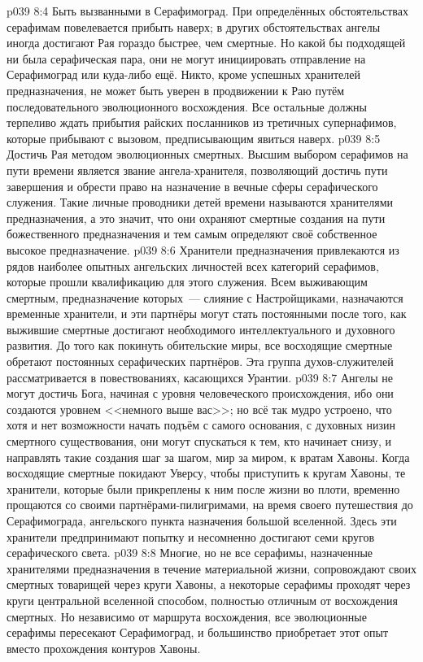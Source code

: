 \vs p039 8:4 Быть вызванными в Серафимоград. При определённых обстоятельствах серафимам повелевается прибыть наверх; в других обстоятельствах ангелы иногда достигают Рая гораздо быстрее, чем смертные. Но какой бы подходящей ни была серафическая пара, они не могут инициировать отправление на Серафимоград или куда\hyp{}либо ещё. Никто, кроме успешных хранителей предназначения, не может быть уверен в продвижении к Раю путём последовательного эволюционного восхождения. Все остальные должны терпеливо ждать прибытия райских посланников из третичных супернафимов, которые прибывают с вызовом, предписывающим явиться наверх.
\vs p039 8:5 Достичь Рая методом эволюционных смертных. Высшим выбором серафимов на пути времени является звание ангела\hyp{}хранителя, позволяющий достичь пути завершения и обрести право на назначение в вечные сферы серафического служения. Такие личные проводники детей времени называются хранителями предназначения, а это значит, что они охраняют смертные создания на пути божественного предназначения и тем самым определяют своё собственное высокое предназначение.
\vs p039 8:6 Хранители предназначения привлекаются из рядов наиболее опытных ангельских личностей всех категорий серафимов, которые прошли квалификацию для этого служения. Всем выживающим смертным, предназначение которых~--- слияние с Настройщиками, назначаются временные хранители, и эти партнёры могут стать постоянными после того, как выжившие смертные достигают необходимого интеллектуального и духовного развития. До того как покинуть обительские миры, все восходящие смертные обретают постоянных серафических партнёров. Эта группа духов\hyp{}служителей рассматривается в повествованиях, касающихся Урантии.
\vs p039 8:7 \pc Ангелы не могут достичь Бога, начиная с уровня человеческого происхождения, ибо они создаются уровнем <<немного выше вас>>; но всё так мудро устроено, что хотя и нет возможности начать подъём с самого основания, с духовных низин смертного существования, они могут спускаться к тем, кто начинает снизу, и направлять такие создания шаг за шагом, мир за миром, к вратам Хавоны. Когда восходящие смертные покидают Уверсу, чтобы приступить к кругам Хавоны, те хранители, которые были прикреплены к ним после жизни во плоти, временно прощаются со своими партнёрами\hyp{}пилигримами, на время своего путешествия до Серафимограда, ангельского пункта назначения большой вселенной. Здесь эти хранители предпринимают попытку и несомненно достигают семи кругов серафического света.
\vs p039 8:8 Многие, но не все серафимы, назначенные хранителями предназначения в течение материальной жизни, сопровождают своих смертных товарищей через круги Хавоны, а некоторые серафимы проходят через круги центральной вселенной способом, полностью отличным от восхождения смертных. Но независимо от маршрута восхождения, все эволюционные серафимы пересекают Серафимоград, и большинство приобретает этот опыт вместо прохождения контуров Хавоны.

